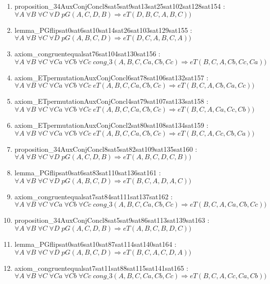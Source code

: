 \documentclass{article}
\begin{document}
\begin{enumerate}
\item proposition\_34AuxConjConcl8sat5sat9sat13sat25sat102sat128sat154 : $\forall A\;\forall B\;\forall C\;\forall D\;pG(A, C, D, B) \Rightarrow eT(D, B, C, A, B, C))$
\item lemma\_PGflipsat0sat6sat10sat14sat26sat103sat129sat155 : $\forall A\;\forall B\;\forall C\;\forall D\;pG(A, B, C, D) \Rightarrow eT(D, C, A, B, C, A))$
\item axiom\_congruentequalsat76sat104sat130sat156 : $\forall A\;\forall B\;\forall C\;\forall Ca\;\forall Cb\;\forall Cc\;cong\_3(A, B, C, Ca, Cb, Cc) \Rightarrow eT(B, C, A, Cb, Cc, Ca))$
\item axiom\_ETpermutationAuxConjConcl6sat78sat106sat132sat157 : $\forall A\;\forall B\;\forall C\;\forall Ca\;\forall Cb\;\forall Cc\;eT(A, B, C, Ca, Cb, Cc) \Rightarrow eT(B, C, A, Cb, Ca, Cc))$
\item axiom\_ETpermutationAuxConjConcl4sat79sat107sat133sat158 : $\forall A\;\forall B\;\forall C\;\forall Ca\;\forall Cb\;\forall Cc\;eT(A, B, C, Ca, Cb, Cc) \Rightarrow eT(B, C, A, Ca, Cc, Cb))$
\item axiom\_ETpermutationAuxConjConcl2sat80sat108sat134sat159 : $\forall A\;\forall B\;\forall C\;\forall Ca\;\forall Cb\;\forall Cc\;eT(A, B, C, Ca, Cb, Cc) \Rightarrow eT(B, C, A, Cc, Cb, Ca))$
\item proposition\_34AuxConjConcl8sat5sat82sat109sat135sat160 : $\forall A\;\forall B\;\forall C\;\forall D\;pG(A, C, D, B) \Rightarrow eT(A, B, C, D, C, B))$
\item lemma\_PGflipsat0sat6sat83sat110sat136sat161 : $\forall A\;\forall B\;\forall C\;\forall D\;pG(A, B, C, D) \Rightarrow eT(B, C, A, D, A, C))$
\item axiom\_congruentequalsat7sat84sat111sat137sat162 : $\forall A\;\forall B\;\forall C\;\forall Ca\;\forall Cb\;\forall Cc\;cong\_3(A, B, C, Ca, Cb, Cc) \Rightarrow eT(B, C, A, Ca, Cb, Cc))$
\item proposition\_34AuxConjConcl8sat5sat9sat86sat113sat139sat163 : $\forall A\;\forall B\;\forall C\;\forall D\;pG(A, C, D, B) \Rightarrow eT(A, B, C, B, D, C))$
\item lemma\_PGflipsat0sat6sat10sat87sat114sat140sat164 : $\forall A\;\forall B\;\forall C\;\forall D\;pG(A, B, C, D) \Rightarrow eT(B, C, A, C, D, A))$
\item axiom\_congruentequalsat7sat11sat88sat115sat141sat165 : $\forall A\;\forall B\;\forall C\;\forall Ca\;\forall Cb\;\forall Cc\;cong\_3(A, B, C, Ca, Cb, Cc) \Rightarrow eT(B, C, A, Cc, Ca, Cb))$

\end{enumerate}
\end{document}
